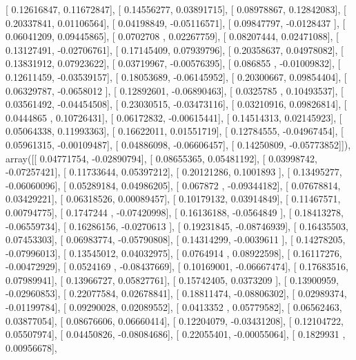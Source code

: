 \documentclass{article}
\begin{document}
       [ 0.12616847,  0.11672847],
       [ 0.14556277,  0.03891715],
       [ 0.08978867,  0.12842083],
       [ 0.20337841,  0.01106564],
       [ 0.04198849, -0.05116571],
       [ 0.09847797, -0.0128437 ],
       [ 0.06041209,  0.09445865],
       [ 0.0702708 ,  0.02267759],
       [ 0.08207444,  0.02471088],
       [ 0.13127491, -0.02706761],
       [ 0.17145409,  0.07939796],
       [ 0.20358637,  0.04978082],
       [ 0.13831912,  0.07923622],
       [ 0.03719967, -0.00576395],
       [ 0.086855  , -0.01009832],
       [ 0.12611459, -0.03539157],
       [ 0.18053689, -0.06145952],
       [ 0.20300667,  0.09854404],
       [ 0.06329787, -0.0658012 ],
       [ 0.12892601, -0.06890463],
       [ 0.0325785 ,  0.10493537],
       [ 0.03561492, -0.04454508],
       [ 0.23030515, -0.03473116],
       [ 0.03210916,  0.09826814],
       [ 0.0444865 ,  0.10726431],
       [ 0.06172832, -0.00615441],
       [ 0.14514313,  0.02145923],
       [ 0.05064338,  0.11993363],
       [ 0.16622011,  0.01551719],
       [ 0.12784555, -0.04967454],
       [ 0.05961315, -0.00109487],
       [ 0.04886098, -0.06606457],
       [ 0.14250809, -0.05773852]]), array([[ 0.04771754, -0.02890794],
       [ 0.08655365,  0.05481192],
       [ 0.03998742, -0.07257421],
       [ 0.11733644,  0.05397212],
       [ 0.20121286,  0.1001893 ],
       [ 0.13495277, -0.06060096],
       [ 0.05289184,  0.04986205],
       [ 0.067872  , -0.09344182],
       [ 0.07678814,  0.03429221],
       [ 0.06318526,  0.00089457],
       [ 0.10179132,  0.03914849],
       [ 0.11467571,  0.00794775],
       [ 0.1747244 , -0.07420998],
       [ 0.16136188, -0.0564849 ],
       [ 0.18413278, -0.06559734],
       [ 0.16286156, -0.0270613 ],
       [ 0.19231845, -0.08746939],
       [ 0.16435503,  0.07453303],
       [ 0.06983774, -0.05790808],
       [ 0.14314299, -0.0039611 ],
       [ 0.14278205, -0.07996013],
       [ 0.13545012,  0.04032975],
       [ 0.0764914 ,  0.08922598],
       [ 0.16117276, -0.00472929],
       [ 0.0524169 , -0.08437669],
       [ 0.10169001, -0.06667474],
       [ 0.17683516,  0.07989941],
       [ 0.13966727,  0.05827761],
       [ 0.15742405,  0.0373209 ],
       [ 0.13900959, -0.02960853],
       [ 0.22077584,  0.02678841],
       [ 0.18811474, -0.08806302],
       [ 0.02989374, -0.01199784],
       [ 0.09290028,  0.02089552],
       [ 0.0413352 ,  0.05779582],
       [ 0.06562463,  0.03877054],
       [ 0.08676606,  0.06660414],
       [ 0.12204079, -0.03431208],
       [ 0.12104722,  0.05507974],
       [ 0.04450826, -0.08084686],
       [ 0.22055401, -0.00055064],
       [ 0.1829931 ,  0.00956678],
\end{document}
